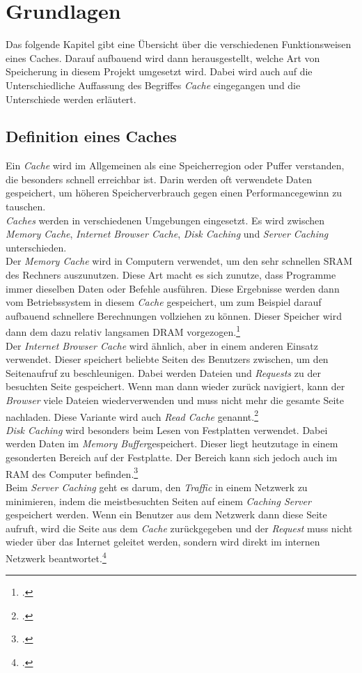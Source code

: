 \chapter{Grundlagen}
\label{cha:grundlagen}
Das folgende Kapitel gibt eine Übersicht über die verschiedenen Funktionsweisen eines Caches. Darauf aufbauend wird dann herausgestellt, welche Art von Speicherung in diesem Projekt umgesetzt wird. Dabei wird auch auf die Unterschiedliche Auffassung des Begriffes \textit{Cache} eingegangen und die Unterschiede werden erläutert.

\section{Definition eines Caches}
\label{sec:cache-definition}
Ein \textit{Cache} wird im Allgemeinen als eine Speicherregion oder Puffer verstanden, die besonders schnell erreichbar ist. Darin werden oft verwendete Daten gespeichert, um höheren Speicherverbrauch gegen einen Performancegewinn zu tauschen.\\
\textit{Caches} werden in verschiedenen Umgebungen eingesetzt. Es wird zwischen \textit{Memory Cache}, \textit{Internet Browser Cache}, \textit{Disk Caching} und \textit{Server Caching} unterschieden.\\
Der \textit{Memory Cache} wird in Computern verwendet, um den sehr schnellen \ac{SRAM} des Rechners auszunutzen. Diese Art macht es sich zunutze, dass Programme immer dieselben Daten oder Befehle ausführen. Diese Ergebnisse werden dann vom Betriebssystem in diesem \textit{Cache} gespeichert, um zum Beispiel darauf aufbauend schnellere Berechnungen vollziehen zu können. Dieser Speicher wird dann dem dazu relativ langsamen \ac{DRAM} vorgezogen.\footcite[Vgl.][S.48f.]{Cache-GummerSommer}\\
Der \textit{Internet Browser Cache} wird ähnlich, aber in einem anderen Einsatz verwendet. Dieser speichert beliebte Seiten des Benutzers zwischen, um den Seitenaufruf zu beschleunigen. Dabei werden Dateien und \textit{Requests} zu der besuchten Seite gespeichert. Wenn man dann wieder zurück navigiert, kann der \textit{Browser} viele Dateien wiederverwenden und muss nicht mehr die gesamte Seite nachladen. Diese Variante wird auch \textit{Read Cache} genannt.\footcite{Cache-Techtarget}\\
\textit{Disk Caching} wird besonders beim Lesen von Festplatten verwendet. Dabei werden Daten im \textit{Memory Buffer}gespeichert. Dieser liegt heutzutage in einem gesonderten Bereich auf der Festplatte. Der Bereich kann sich jedoch auch im \ac{RAM} des Computer befinden.\footcite{Cache-Techtarget-DiskCache}\\
Beim \textit{Server Caching} geht es darum, den \textit{Traffic} in einem Netzwerk zu minimieren, indem die meistbesuchten Seiten auf einem \textit{Caching Server} gespeichert werden. Wenn ein Benutzer aus dem Netzwerk dann diese Seite aufruft, wird die Seite aus dem \textit{Cache} zurückgegeben und der \textit{Request} muss nicht wieder über das Internet geleitet werden, sondern wird direkt im internen Netzwerk beantwortet.\footcite{Cache-ProxyCache}\\

